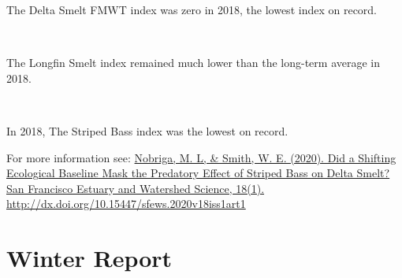 \documentclass[
]{book}
\begin{document}
\begin{panel-grid}
\begin{columns-nocenter}
\begin{column800}
\begin{expand}
\end{expand}

\end{column800}

\end{columns-nocenter}

\begin{columns-nocenter}

\begin{column800}

The Delta Smelt FMWT index was zero in 2018, the lowest index on record.

\end{column800}

\begin{column40}

~

\end{column40}

\begin{column800}

The Longfin Smelt index remained much lower than the long-term average in 2018.

\end{column800}

\begin{column40}

~

\end{column40}

\begin{column800}

In 2018, The Striped Bass index was the lowest on record.

\end{column800}

\end{columns-nocenter}

\end{panel-grid}

\begin{disclaimer}
For more information see:
\href{http://dx.doi.org/10.15447/sfews.2020v18iss1art1}{Nobriga, M. L,
\& Smith, W. E. (2020). Did a Shifting Ecological Baseline Mask the
Predatory Effect of Striped Bass on Delta Smelt? San Francisco Estuary
and Watershed Science, 18(1).}
\url{http://dx.doi.org/10.15447/sfews.2020v18iss1art1}
\end{disclaimer}

\hypertarget{Winter}{%
\chapter{Winter Report}\label{Winter}}
\end{document}
